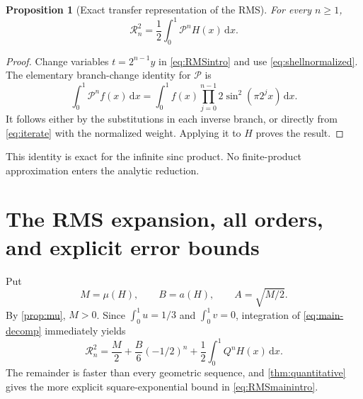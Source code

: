 \documentclass[11pt,a4paper]{article}
\newtheorem{proposition}[theorem]{Proposition}
\theoremstyle{definition}
\theoremstyle{remark}
\newcommand{\dd}{\,\mathrm d}
\newcommand{\Pop}{\mathcal P}
\numberwithin{equation}{section}
\begin{document}
\begin{proposition}[Exact transfer representation of the RMS]
\label{prop:RMStransfer}
For every $n\ge1$,
\begin{equation}
 \boxed{\displaystyle \mathcal R_n^2=\frac12\int_0^1\Pop^nH(x)\dd x.}
 \label{eq:RMStransfer}
\end{equation}
\end{proposition}
\begin{proof}
Change variables $t=2^{n-1}y$ in \cref{eq:RMSintro} and use
\cref{eq:shellnormalized}. The elementary branch-change identity for
$\Pop$ is
\[
 \int_0^1\Pop^nf(x)\dd x
 =\int_0^1 f(x)\prod_{j=0}^{n-1}2\sin^2(\pi2^jx)\dd x.
\]
It follows either by the substitutions in each inverse branch, or directly
from \cref{eq:iterate} with the normalized weight. Applying it to $H$
proves the result.
\end{proof}

This identity is exact for the infinite sinc product. No finite-product
approximation enters the analytic reduction.

\section{The RMS expansion, all orders, and explicit error bounds}
\label{sec:RMS}
Put
\begin{equation}
 M=\mu(H),\qquad B=a(H),\qquad A=\sqrt{M/2}.
 \label{eq:constants}
\end{equation}
By \cref{prop:mu}, $M>0$. Since
$\int_0^1u=1/3$ and $\int_0^1v=0$, integration of
\cref{eq:main-decomp} immediately yields
\begin{equation}
 \mathcal R_n^2=\frac M2+\frac B6(-1/2)^n+
            \frac12\int_0^1 Q^nH(x)\dd x.
 \label{eq:RMSexactremainder}
\end{equation}
The remainder is faster than every geometric sequence, and
\cref{thm:quantitative} gives the more explicit square-exponential bound
in \cref{eq:RMSmainintro}.
\end{document}

